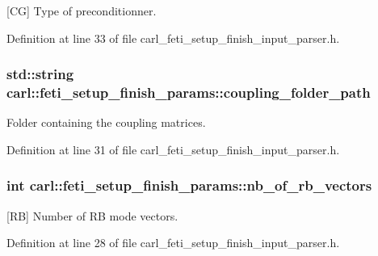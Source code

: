 \mbox{[}C\+G\mbox{]} Type of preconditionner. 



Definition at line 33 of file carl\+\_\+feti\+\_\+setup\+\_\+finish\+\_\+input\+\_\+parser.\+h.

\hypertarget{structcarl_1_1feti__setup__finish__params_aebb6a453ba760ab225a75d6b4e96fa75}{}
\subsubsection[{coupling\+\_\+folder\+\_\+path}]{\setlength{\rightskip}{0pt plus 5cm}std\+::string carl\+::feti\+\_\+setup\+\_\+finish\+\_\+params\+::coupling\+\_\+folder\+\_\+path}\label{structcarl_1_1feti__setup__finish__params_aebb6a453ba760ab225a75d6b4e96fa75}


Folder containing the coupling matrices. 



Definition at line 31 of file carl\+\_\+feti\+\_\+setup\+\_\+finish\+\_\+input\+\_\+parser.\+h.

\hypertarget{structcarl_1_1feti__setup__finish__params_a3fea6d0b9c2825b61e90714790c716de}{}
\subsubsection[{nb\+\_\+of\+\_\+rb\+\_\+vectors}]{\setlength{\rightskip}{0pt plus 5cm}int carl\+::feti\+\_\+setup\+\_\+finish\+\_\+params\+::nb\+\_\+of\+\_\+rb\+\_\+vectors}\label{structcarl_1_1feti__setup__finish__params_a3fea6d0b9c2825b61e90714790c716de}


\mbox{[}R\+B\mbox{]} Number of R\+B mode vectors. 



Definition at line 28 of file carl\+\_\+feti\+\_\+setup\+\_\+finish\+\_\+input\+\_\+parser.\+h.

\hypertarget{structcarl_1_1feti__setup__finish__params_aebec4649657ad7602a20111ffdb01e06}{}
